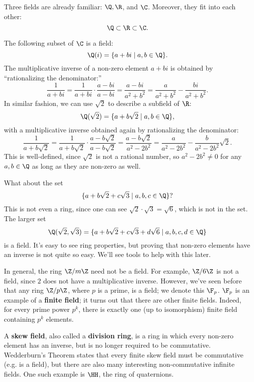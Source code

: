 \documentclass[math1530-lecture-notes]{subfiles}
\begin{document}
\begin{example}
  Three fields are already familiar: $\Q, \R$, and $\C$. Moreover, they fit into each other: \[
    \Q \subset \R \subset \C
  .\] 
\end{example}
\begin{example}
  The following subset of $\C$ is a field: \[
    \Q(i)=\{a+bi\mid a,b\in \Q\} 
  .\] The multiplicative inverse of a non-zero element $a+bi$ is obtained by ``rationalizing the
  denominator:'' \[
    \frac{1}{a+bi}=\frac{1}{a+bi}\cdot
    \frac{a-bi}{a-bi}=\frac{a-bi}{a^2+b^2}=\frac{a}{a^2+b^2}-\frac{bi}{a^2+b^2}
  .\] In similar fashion, we can use $\sqrt{2}$ to describe a subfield of $\R$: \[
  \Q(\sqrt{2}) = \{a+b\sqrt{2}\mid a,b\in \Q\} 
  ,\] with a multiplicative inverse obtained again by rationalizing the denominator: \[
    \frac{1}{a+b\sqrt{2}}=\frac{1}{a+b\sqrt{2}}\cdot
    \frac{a-b\sqrt{2}}{a-b\sqrt{2}}=\frac{a-b\sqrt{2}}{a^2-2b^2}
    =\frac{a}{a^2-2b^2}-\frac{b}{a^2-2b^2}\sqrt{2}
  .\] This is well-defined, since $\sqrt{2}$ is not a rational number, so $a^2-2b^2\neq 0$ for any
  $a,b\in \Q$ as long as they are non-zero as well.

  What about the set \[
     \{a+b\sqrt{2}+c\sqrt{3}\mid a,b,c\in \Q \} 
  ?\] This is not even a ring, since one can see $\sqrt{2}\cdot \sqrt{3}=\sqrt{6}$, which is not in
  the set. The larger set \[
    \Q(\sqrt{2},\sqrt{3})=\{a+b\sqrt{2}+c\sqrt{3}+d\sqrt{6}\mid a,b,c,d\in \Q \} 
  \] is a field. It's easy to see ring properties, but proving that non-zero elements have an
  inverse is not quite so easy. We'll see tools to help with this later.
\end{example}

\begin{example}
  In general, the ring $\Z / m\Z$ need not be a field. For example, $\Z / 6\Z$ is not a field, since
  $2$ does not have a multiplicative inverse. However, we've seen before that any ring $\Z / p\Z$,
  where $p$ is a prime, is a field; we denote this $\F_p$. $\F_p$ is an example of a \textbf{finite
  field}; it turns out that there are other finite fields. Indeed, for every prime power $p^k$,
  there is exactly one (up to isomorphism) finite field containing $p^k$ elements. 
\end{example}

\begin{example}
  A \textbf{skew field}, also called a \textbf{division ring}, is a ring in which every non-zero
  element has an inverse, but is no longer required to be commutative. Wedderburn's Theorem states
  that every finite skew field must be commutative (e.g. is a field), but there are also many
  interesting non-commutative infinite fields. One such example is $\HH$, the ring of quaternions.
\end{example}
\end{document}

